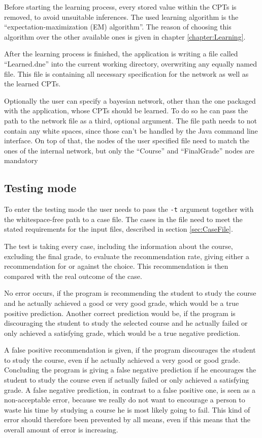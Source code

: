\documentclass[%
	pdftex,
	oneside,        %
	11pt,           %
	parskip=half,   %
	headsepline,    %
	footsepline,    %
	abstracton,     %
	USenglish,      %
	a4paper,        %
]{report}
\begin{document}
Before starting the learning process, every stored value within the CPTs is removed, to avoid unsuitable inferences. The used learning algorithm is the \enquote{expectation-maximization (EM) algorithm}. The reason of choosing this algorithm over the other available ones is given in chapter \vref{chapter:Learning}.

After the learning process is finished, the application is writing a file called \enquote{Learned.dne} into the current working directory, overwriting any equally named file. This file is containing all necessary specification for the network as well as the learned CPTs.

Optionally the user can specify a bayesian network, other than the one packaged with the application, whose CPTs should be learned. To do so he can pass the path to the network file as a third, optional argument. The file path needs to not contain any white spaces, since those can't be handled by the Java command line interface. On top of that, the nodes of the user specified file need to match the ones of the internal network, but only the \enquote{Course} and \enquote{FinalGrade} nodes are mandatory

\subsection{Testing mode}
\label{sec:Test}
To enter the testing mode the user needs to pass the \texttt{-t} argument together with the whitespace-free path to a case file. The cases in the file need to meet the stated requirements for the input files, described in section \vref{sec:CaseFile}.

The test is taking every case, including the information about the course, excluding the final grade, to evaluate the recommendation rate, giving either a recommendation for or against the choice. This recommendation is then compared with the real outcome of the case.

No error occurs, if the program is recommending the student to study the course and he actually achieved a good or very good grade, which would be a true positive prediction. Another correct prediction would be, if the program is discouraging the student to study the selected course and he actually failed or only achieved a satisfying grade, which would be a true negative prediction.

A false positive recommendation is given, if the program discourages the student to study the course, even if he actually achieved a very good or good grade. Concluding the program is giving a false negative prediction if he encourages the student to study the course even if actually failed or only achieved a satisfying grade. A false negative prediction, in contrast to a false positive one, is seen as a non-acceptable error, because we really do not want to encourage a person to waste his time by studying a course he is most likely going to fail. This kind of error should therefore been prevented by all means, even if this means that the overall amount of error is increasing.
\end{document}
